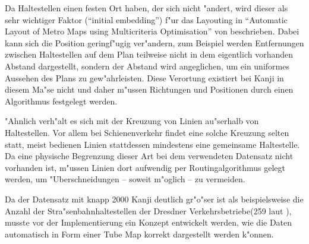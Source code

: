 Da Haltestellen einen festen Ort haben, der sich nicht "andert, wird dieser als sehr wichtiger Faktor ("`initial embedding"') f"ur das Layouting in "`Automatic Layout of Metro Maps using Multicriteria Optimisation"' von \cite{automaticlayoutmetro08} beschrieben. Dabei kann sich die Position geringf"ugig ver"andern, zum Beispiel werden Entfernungen zwischen Haltestellen auf dem Plan teilweise nicht in dem eigentlich vorhanden Abstand dargestellt, sondern der Abstand wird angeglichen, um ein uniformes Aussehen des Plans zu gew"ahrleisten. Diese Verortung existiert bei Kanji in diesem Ma"se nicht und daher m"ussen Richtungen und Positionen durch einen Algorithmus festgelegt werden. 

"Ahnlich verh"alt es sich mit der Kreuzung von Linien au"serhalb von Haltestellen. Vor allem bei Schienenverkehr findet eine solche Kreuzung selten statt, meist bedienen Linien stattdessen mindestens eine gemeinsame Haltestelle. Da eine physische Begrenzung dieser Art bei dem verwendeten Datensatz nicht vorhanden ist, m"ussen Linien dort aufwendig per Routingalgorithmus gelegt werden, um "Uberschneidungen – soweit m"oglich – zu vermeiden.

Da der Datensatz mit knapp 2000 Kanji deutlich gr"o"ser ist als beispielsweise die Anzahl der Stra"senbahnhaltestellen der Dresdner Verkehrsbetriebe(259 laut \cite{dvbag}), musste vor der Implementierung ein Konzept entwickelt werden, wie die Daten automatisch in Form einer Tube Map korrekt dargestellt werden k"onnen.
